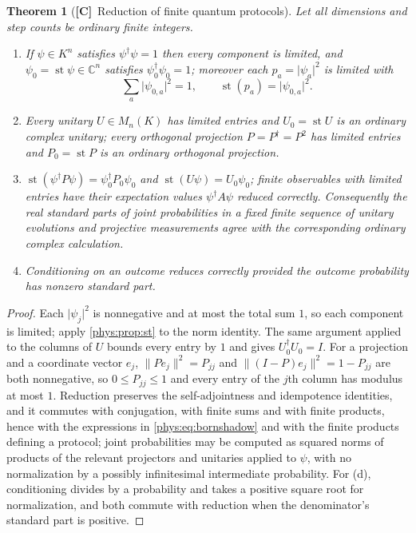 \documentclass[11pt,letterpaper]{article}
\numberwithin{equation}{section}
\newtheorem{theorem}{Theorem}[section]
\theoremstyle{definition}
\theoremstyle{remark}
\newcommand{\C}{\mathbb C}
\DeclareMathOperator{\st}{st}
\newcommand{\abs}[1]{\lvert#1\rvert}
\newcommand{\TC}{\textcolor{TierC}{\textsf{\bfseries[C]}}}
\begin{document}
\begin{theorem}[\TC\ Reduction of finite quantum protocols]
\label{phys:thm:quantumshadow}
Let all dimensions and step counts be ordinary finite integers.
\begin{enumerate}[label=\textup{(\alph*)},leftmargin=2.4em]
\item If $\psi\in K^{n}$ satisfies $\psi^{\dagger}\psi=1$ then every component
is limited, and $\psi_{0}=\st\psi\in\C^{n}$ satisfies
$\psi_{0}^{\dagger}\psi_{0}=1$; moreover each $p_{a}=\abs{\psi_{a}}^{2}$ is
limited with
\begin{equation}\label{phys:eq:bornshadow}
\sum_{a}\abs{\psi_{0,a}}^{2}=1,\qquad \st(p_{a})=\abs{\psi_{0,a}}^{2}.
\end{equation}
\item Every unitary $U\in M_{n}(K)$ has limited entries and $U_{0}=\st U$ is an
ordinary complex unitary; every orthogonal projection $P=P^{\dagger}=P^{2}$ has
limited entries and $P_{0}=\st P$ is an ordinary orthogonal projection.
\item $\st(\psi^{\dagger}P\psi)=\psi_{0}^{\dagger}P_{0}\psi_{0}$ and
$\st(U\psi)=U_{0}\psi_{0}$; finite observables with limited entries have their
expectation values $\psi^{\dagger}A\psi$ reduced correctly. Consequently the
real standard parts of joint probabilities in a fixed finite sequence of
unitary evolutions and projective measurements agree with the corresponding
ordinary complex calculation.
\item Conditioning on an outcome reduces correctly \emph{provided} the outcome
probability has nonzero standard part.
\end{enumerate}
\end{theorem}
\begin{proof}
Each $\abs{\psi_{j}}^{2}$ is nonnegative and at most the total sum $1$, so each
component is limited; apply \cref{phys:prop:st} to the norm identity. The same
argument applied to the columns of $U$ bounds every entry by $1$ and gives
$U_{0}^{\dagger}U_{0}=I$. For a projection and a coordinate vector $e_{j}$,
$\lVert Pe_{j}\rVert^{2}=P_{jj}$ and $\lVert(I-P)e_{j}\rVert^{2}=1-P_{jj}$ are
both nonnegative, so $0\le P_{jj}\le1$ and every entry of the $j$th column has
modulus at most $1$. Reduction preserves the self-adjointness and idempotence
identities, and it commutes with conjugation, with finite sums and with finite
products, hence with the expressions in \eqref{phys:eq:bornshadow} and with the
finite products defining a protocol; joint probabilities may be computed as
squared norms of products of the relevant projectors and unitaries applied to
$\psi$, with no normalization by a possibly infinitesimal intermediate
probability. For (d), conditioning divides by a probability and takes a
positive square root for normalization, and both commute with reduction when
the denominator's standard part is positive.
\end{proof}
\end{document}
